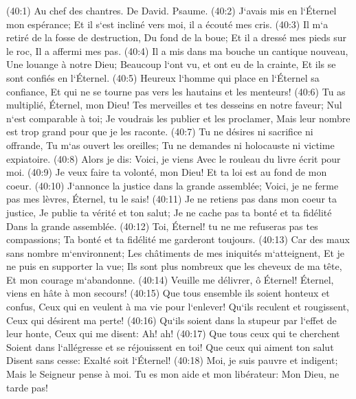 \verse (40:1) Au chef des chantres. De David. Psaume. (40:2) J`avais mis en l`Éternel mon espérance; Et il s`est incliné vers moi, il a écouté mes cris. 
\verse (40:3) Il m`a retiré de la fosse de destruction, Du fond de la boue; Et il a dressé mes pieds sur le roc, Il a affermi mes pas. 
\verse (40:4) Il a mis dans ma bouche un cantique nouveau, Une louange à notre Dieu; Beaucoup l`ont vu, et ont eu de la crainte, Et ils se sont confiés en l`Éternel. 
\verse (40:5) Heureux l`homme qui place en l`Éternel sa confiance, Et qui ne se tourne pas vers les hautains et les menteurs! 
\verse (40:6) Tu as multiplié, Éternel, mon Dieu! Tes merveilles et tes desseins en notre faveur; Nul n`est comparable à toi; Je voudrais les publier et les proclamer, Mais leur nombre est trop grand pour que je les raconte. 
\verse (40:7) Tu ne désires ni sacrifice ni offrande, Tu m`as ouvert les oreilles; Tu ne demandes ni holocauste ni victime expiatoire. 
\verse (40:8) Alors je dis: Voici, je viens Avec le rouleau du livre écrit pour moi. 
\verse (40:9) Je veux faire ta volonté, mon Dieu! Et ta loi est au fond de mon coeur. 
\verse (40:10) J`annonce la justice dans la grande assemblée; Voici, je ne ferme pas mes lèvres, Éternel, tu le sais! 
\verse (40:11) Je ne retiens pas dans mon coeur ta justice, Je publie ta vérité et ton salut; Je ne cache pas ta bonté et ta fidélité Dans la grande assemblée. 
\verse (40:12) Toi, Éternel! tu ne me refuseras pas tes compassions; Ta bonté et ta fidélité me garderont toujours. 
\verse (40:13) Car des maux sans nombre m`environnent; Les châtiments de mes iniquités m`atteignent, Et je ne puis en supporter la vue; Ils sont plus nombreux que les cheveux de ma tête, Et mon courage m`abandonne. 
\verse (40:14) Veuille me délivrer, ô Éternel! Éternel, viens en hâte à mon secours! 
\verse (40:15) Que tous ensemble ils soient honteux et confus, Ceux qui en veulent à ma vie pour l`enlever! Qu`ils reculent et rougissent, Ceux qui désirent ma perte! 
\verse (40:16) Qu`ils soient dans la stupeur par l`effet de leur honte, Ceux qui me disent: Ah! ah! 
\verse (40:17) Que tous ceux qui te cherchent Soient dans l`allégresse et se réjouissent en toi! Que ceux qui aiment ton salut Disent sans cesse: Exalté soit l`Éternel! 
\verse (40:18) Moi, je suis pauvre et indigent; Mais le Seigneur pense à moi. Tu es mon aide et mon libérateur: Mon Dieu, ne tarde pas! 

\chapter{}

